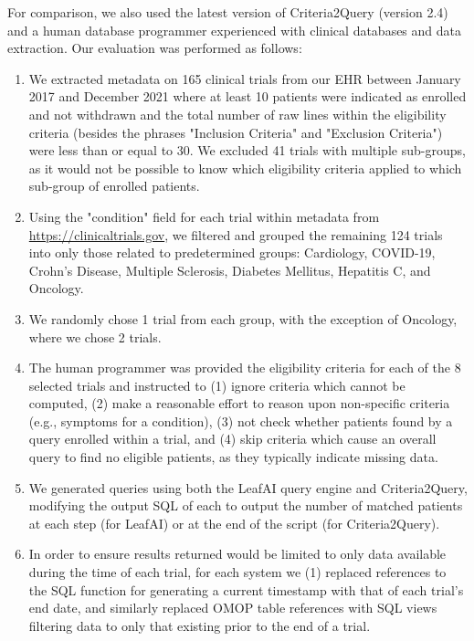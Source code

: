 \documentclass[../main.tex]{subfiles}
\begin{document}
For comparison, we also used the latest version of Criteria2Query (version 2.4) and a human database programmer experienced with clinical databases and data extraction. Our evaluation was performed as follows:

\begin{enumerate}
    \item We extracted metadata on 165 clinical trials from our EHR between January 2017 and December 2021 where at least 10 patients were indicated as enrolled and not withdrawn and the total number of raw lines within the eligibility criteria (besides the phrases "Inclusion Criteria" and "Exclusion Criteria") were less than or equal to 30. We excluded 41 trials with multiple sub-groups, as it would not be possible to know which eligibility criteria applied to which sub-group of enrolled patients.
    \item Using the "condition" field for each trial within metadata from \url{https://clinicaltrials.gov}, we filtered and grouped the remaining 124 trials into only those related to predetermined groups: Cardiology, COVID-19, Crohn's Disease, Multiple Sclerosis, Diabetes Mellitus, Hepatitis C, and Oncology. 
    \item We randomly chose 1 trial from each group, with the exception of Oncology, where we chose 2 trials.
    \item The human programmer was provided the eligibility criteria for each of the 8 selected trials and instructed to (1) ignore criteria which cannot be computed, (2) make a reasonable effort to reason upon non-specific criteria (e.g., symptoms for a condition), (3) not check whether patients found by a query enrolled within a trial, and (4) skip criteria which cause an overall query to find no eligible patients, as they typically indicate missing data.
    \item We generated queries using both the LeafAI query engine and Criteria2Query, modifying the output SQL of each to output the number of matched patients at each step (for LeafAI) or at the end of the script (for Criteria2Query). 
    \item In order to ensure results returned would be limited to only data available during the time of each trial, for each system we (1) replaced references to the SQL function for generating a current timestamp with that of each trial's end date, and similarly replaced OMOP table references with SQL views filtering data to only that existing prior to the end of a trial.
\end{enumerate}
\end{document}
